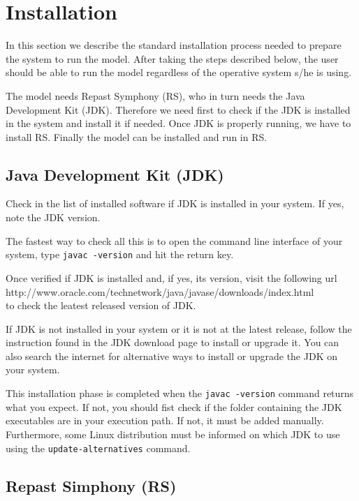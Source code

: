 \documentclass{book}
\begin{document}
\section{Installation}

In this section we describe the standard installation process needed to prepare the system to run the model. After taking the steps described below, the user should be able to run the model regardless of the operative system s/he is using.

The model needs Repast Symphony (RS), who in turn needs the Java Development Kit (JDK). Therefore we need first to check if the JDK is installed in the system and install it if needed. Once JDK is properly running, we have to install RS. Finally the model can be installed and run in RS.

\subsection{Java Development Kit (JDK)}

Check in the list of installed software if JDK is installed in your system. If yes, note the JDK version.

The fastest way to check all this is to open the command line interface of your system, type \verb+javac -version+ and hit the return key. 

Once verified if JDK is installed and, if yes, its version, visit the following url\\
http://www.oracle.com/technetwork/java/javase/downloads/index.html\\
to check the leatest released version of JDK.

If JDK is not installed in your system or it is not at the latest release, follow the instruction found in the JDK download page to install or upgrade it. You can also search the internet for alternative ways to install or upgrade the JDK on your system.

This installation phase is completed when the \verb+javac -version+ command returns what you expect.
If not, you should fist check if the folder containing the JDK executables are in your execution path. If not, it must be added manually.
Furthermore, some Linux distribution must be informed on which JDK to use using the \verb+update-alternatives+ command. 

\subsection{Repast Simphony (RS)}
\end{document}
